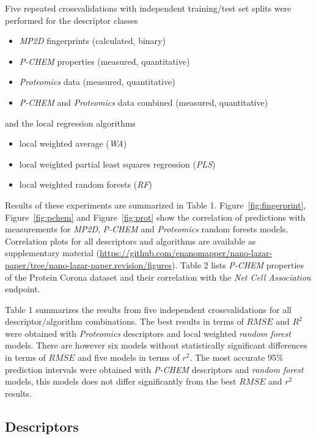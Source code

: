 \documentclass[utf8]{frontiersHLTH} %
\providecommand{\tightlist}{%
  \setlength{\itemsep}{0pt}\setlength{\parskip}{0pt}}
\begin{document}
Five repeated crossvalidations with independent training/test set splits
were performed for the descriptor classes

\begin{itemize}
\tightlist
\item
  \emph{MP2D} fingerprints (calculated, binary)
\item
  \emph{P-CHEM} properties (measured, quantitative)
\item
  \emph{Proteomics} data (measured, quantitative)
\item
  \emph{P-CHEM} and \emph{Proteomics} data combined (measured,
  quantitative)
\end{itemize}

and the local regression algorithms

\begin{itemize}
\tightlist
\item
  local weighted average (\emph{WA})
\item
  local weighted partial least squares regression (\emph{PLS})
\item
  local weighted random forests (\emph{RF})
\end{itemize}

Results of these experiments are summarized in Table 1.
Figure~\ref{fig:fingerprint}, Figure~\ref{fig:pchem} and
Figure~\ref{fig:prot} show the correlation of predictions with
measurements for \emph{MP2D}, \emph{P-CHEM} and \emph{Proteomics} random
forests models. Correlation plots for all descriptors and algorithms are
available as supplementary material
(\url{https://github.com/enanomapper/nano-lazar-paper/tree/nano-lazar-paper.revision/figures}).
Table 2 lists \emph{P-CHEM} properties of the Protein Corona dataset and
their correlation with the \emph{Net Cell Association} endpoint.

Table 1 summarizes the results from five independent crossvalidations
for all descriptor/algorithm combinations. The best results in terms of
\(RMSE\) and \(R^2\) were obtained with \emph{Proteomics} descriptors
and local weighted \emph{random forest} models. There are however six
models without statistically significant differences in terms of
\(RMSE\) and five models in terms of \(r^2\). The most accurate 95\%
prediction intervals were obtained with \emph{P-CHEM} descriptors and
\emph{random forest} models, this models does not differ significantly
from the best \(RMSE\) and \(r^2\) results.

\subsection{Descriptors}\label{descriptors}
\end{document}
